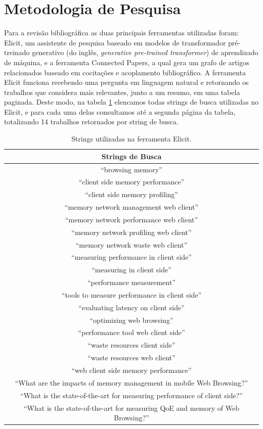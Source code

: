 \documentclass[12pt]{tcc}
\begin{document}
	\section{Metodologia de Pesquisa}
	\label{section:metodologia-de-pesquisa}

	Para a revisão bibliográfica as duas principais ferramentas utilizadas foram: Elicit, um assistente de pesquisa baseado em modelos de transformador pré-treinado generativo (do inglês, \emph{generative pre-trained transformer}) de aprendizado de máquina, e a ferramenta Connected Papers, a qual  gera um grafo de artigos relacionados baseado em cocitações e acoplamento bibliográfico.
	A ferramenta Elicit funciona recebendo uma pergunta em linguagem natural e retornando os trabalhos que considera mais relevantes, junto a um resumo, em uma tabela paginada.
	Deste modo, na tabela \ref{tab:strings-elicit} elencamos todas strings de busca utilizadas no Elicit, e para cada uma delas consultamos até a segunda página da tabela, totalizando 14 trabalhos retornados por string de busca.

	\begin{table}[h!]
	\centering
	\caption{Strings utilizadas na ferramenta Elicit.\label{long}}
		\begin{tabular}{||c||} 
			
		\hline
			Strings de Busca \\
		\hline\hline
		``browsing memory'' \\
		``client side memory performance'' \\
		``client side memory profiling'' \\
		``memory network management web client'' \\
		``memory network performance web client'' \\
		``memory network profiling web client'' \\
		``memory network waste web client'' \\
		``measuring performance in client side'' \\
		``measuring in client side'' \\
		``performance measurement'' \\
		``tools to measure performance in client side'' \\
		``evaluating latency on client side'' \\
		``optimizing web browsing'' \\
		``performance tool web client side'' \\
		``waste resources client side'' \\
		``waste resources web client'' \\
		``web client side memory performance'' \\
		``What are the impacts of memory management in mobile Web Browsing?'' \\
		``What is the state-of-the-art for measuring performance of client side?'' \\
		``What is the state-of-the-art for measuring QoE and memory of Web Browsing?'' \\

		\hline
		\end{tabular}
	\label{tab:strings-elicit}
	\end{table}
\end{document}
